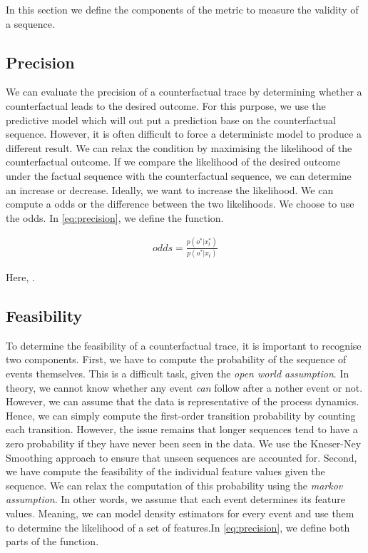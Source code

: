 \documentclass[./../../paper.tex]{subfiles}
\begin{document}
In this section we define the components of the metric to measure the validity of a sequence.

\subsection{Precision}
We can evaluate the precision of a counterfactual trace by determining whether a counterfactual leads to the desired outcome. For this purpose, we use the predictive model which will out put a prediction base on the counterfactual sequence. However, it is often difficult to force a deterministc model to produce a different result. We can relax the condition by maximising the likelihood of the counterfactual outcome. If we compare the likelihood of the desired outcome under the factual sequence with the counterfactual sequence, we can determine an increase or decrease. Ideally, we want to increase the likelihood. We can compute a odds or the difference between the two likelihoods. We choose to use the odds. In \autoref{eq:precision}, we define the function.

\begin{align}
    \label{eq:precision}
    odds = \frac{p(o^*|x^*_t)}{p(o^*|x_t)}
\end{align}

Here, .

\subsection{Feasibility}
To determine the feasibility of a counterfactual trace, it is important to recognise two components. First, we have to compute the probability of the sequence of events themselves. This is a difficult task, given the \emph{open world assumption}. In theory, we cannot know whether any event \emph{can} follow after a nother event or not. However, we can assume that the data is representative of the process dynamics. Hence, we can simply compute the first-order transition probability by counting each transition. However, the issue remains that longer sequences tend to have a zero probability if they have never been seen in the data. We use the Kneser-Ney Smoothing\needscite{} approach to ensure that unseen sequences are accounted for. Second, we have compute the feasibility of the individual feature values given the sequence. We can relax the computation of this probability using the \emph{markov assumption}. In other words, we assume that each event determines its feature values. Meaning, we can model density estimators for every event and use them to determine the likelihood of a set of features.In \autoref{eq:precision}, we define both parts of the function.
\end{document}
